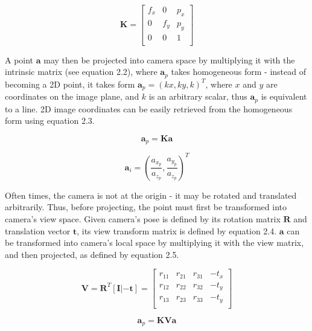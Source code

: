 \documentclass[11pt,english]{report}
\begin{document}
\begin{equation}
	\mathbf{K} =
	\left[ {\begin{array}{ccc}
		f_x & 0 & p_x \\
		0 & f_y & p_y \\
		0 & 0 & 1 \\
	\end{array} } \right]
\end{equation}

A point $\mathbf{a}$ may then be projected into camera space by multiplying it with the intrinsic matrix (see equation 2.2), where $\mathbf{a}_p$ takes homogeneous form - instead of becoming a 2D point, it takes form $\mathbf{a}_p = (kx, ky, k)^T$, where $x$ and $y$ are coordinates on the image plane, and $k$ is an arbitrary scalar, thus $\mathbf{a}_p$ is equivalent to a line. 2D image coordinates can be easily retrieved from the homogeneous form using equation 2.3.

\begin{equation}
	\mathbf{a}_p = \mathbf{Ka}
\end{equation}

\begin{equation}
	\mathbf{a}_i = \left({
		\frac{a_{x_p}}{a_{z_p}}, \frac{a_{y_p}}{a_{z_p}}
	}\right)^T
\end{equation}

Often times, the camera is not at the origin - it may be rotated and translated arbitrarily. Thus, before projecting, the point must first be transformed into camera's view space. Given camera's pose is defined by its rotation matrix $\mathbf{R}$ and translation vector $\mathbf{t}$, its view transform matrix is defined by equation 2.4. $\mathbf{a}$ can be transformed into camera's local space by multiplying it with the view matrix, and then projected, as defined by equation 2.5.

\begin{equation}
	\mathbf{V} = \mathbf{R}^T[\mathbf{I}|-\mathbf{t}] = 
	\left[ {\begin{array}{cccc}
		r_{11} & r_{21} & r_{31} & - t_x \\
		r_{12} & r_{22} & r_{32} & - t_y \\
		r_{13} & r_{23} & r_{33} & - t_y \\
	\end{array} } \right]
\end{equation}

\begin{equation}
	\mathbf{a}_p = \mathbf{KVa}
\end{equation}
\end{document}
